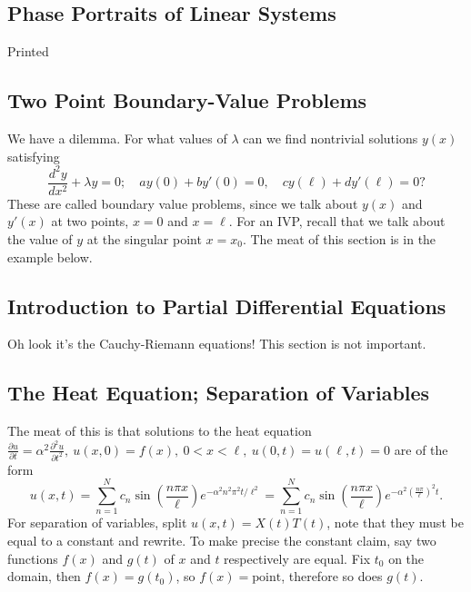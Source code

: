 \subsection{Phase Portraits of Linear Systems}
Printed

\subsection{Two Point Boundary-Value Problems}
We have a dilemma. For what values of $\lambda$ can we find nontrivial solutions $y(x) $ satisfying 
\begin{equation}\label{bd}
    \frac{d^2y}{dx^2}+\lambda y =0;\quad ay(0)+by'(0)=0, \quad cy(\ell)+dy'(\ell)=0?
\end{equation}
 These are called boundary value problems, since we talk about $y(x)$ and $y'(x)$ at two points, $x=0$ and $x=\ell$. For an IVP, recall that we talk about the value of $y$ at the singular point $x=x_0$. The meat of this section is in the example below.

\subsection{Introduction to Partial Differential Equations}
Oh look it's the Cauchy-Riemann equations! This section is not important.

\subsection{The Heat Equation; Separation of Variables}
The meat of this is that solutions to the heat equation $\frac{\partial u}{\partial t}=\alpha ^2 \frac{\partial ^2 u}{\partial t^2},\ u(x,0)=f(x), \ 0<x<\ell,\ u(0,t)=u(\ell,t)=0$ are of the form \[
        u(x,t)=\sum_{n=1}^{N} c_n  \sin\left( \frac{n \pi x}{\ell} \right) e^{-\alpha ^2 n^2\pi^2 t /\ell ^2}= \sum_{n=1}^{N} c_n \sin \left( \frac{n\pi x}{\ell} \right) e^{-\alpha ^2 \left( \frac{n\pi}{\ell} \right) ^2t}.
    \] For separation of variables, split $u(x,t)=X(t)T(t)$, note that they must be equal to a constant and rewrite. To make precise the constant claim, say two functions $f(x)$ and $g(t)$ of $x$ and $t$ respectively are equal. Fix $t_0$ on the domain, then $f(x)=g(t_0)$, so $f(x)=\text{point} $, therefore so does $g(t)$.

